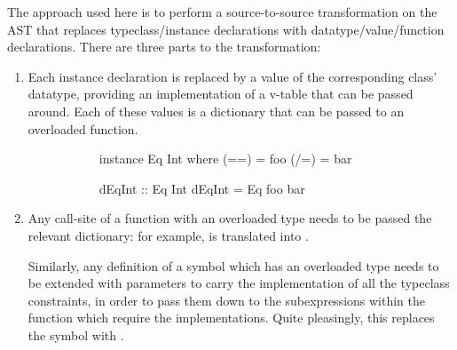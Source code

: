 \documentclass[dissertation.tex]{subfiles}
\begin{document}
{{{            The approach used here is to perform a source-to-source transformation on the AST that replaces typeclass/instance declarations with datatype/value/function declarations. There are three parts to the transformation:
            
            \begin{enumerate}
            \item
            {
                Each instance declaration is replaced by a value of the corresponding class' datatype, providing an
                implementation of a v-table that can be passed around. Each of these values is a dictionary that can be
                passed to an overloaded function.

                \begin{figure}[H]
                \centering
                \begin{subfigure}[t]{0.25\textwidth}
                \begin{haskellfigure}
                instance Eq Int where
                    (==) = foo
                    (/=) = bar
                \end{haskellfigure}
                \end{subfigure}
                \hspace{5mm}
                \begin{subfigure}[t]{0.25\textwidth}
                \begin{haskellfigure}
                dEqInt :: Eq Int
                dEqInt = Eq foo bar
                \end{haskellfigure}
                \end{subfigure}
                \end{figure}
            }
            \item
            {

                Any call-site of a function with an overloaded type needs to be passed the relevant dictionary: for example,  is translated into .

                Similarly, any definition of a symbol which has an overloaded type needs to be extended with parameters to carry the implementation of all the typeclass constraints, in order to pass them down to the subexpressions within the function which require the implementations. Quite pleasingly, this replaces the \haskell{=>} symbol with \haskell{->}.

}
\end{enumerate}}}}
\end{document}
